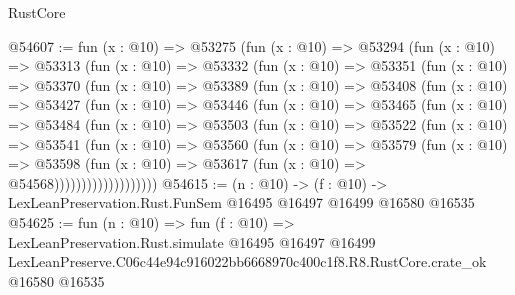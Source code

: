 \begin{lexlean}{RustCore}
\begin{coremodule}
@54607 := fun (x : @10) =>
  @53275
    (fun (x : @10) =>
    @53294
      (fun (x : @10) =>
      @53313
        (fun (x : @10) =>
        @53332
          (fun (x : @10) =>
          @53351
            (fun (x : @10) =>
            @53370
              (fun (x : @10) =>
              @53389
                (fun (x : @10) =>
                @53408
                  (fun (x : @10) =>
                  @53427
                    (fun (x : @10) =>
                    @53446
                      (fun (x : @10) =>
                      @53465
                        (fun (x : @10) =>
                        @53484
                          (fun (x : @10) =>
                          @53503
                            (fun (x : @10) =>
                            @53522
                              (fun (x : @10) =>
                              @53541
                                (fun (x : @10) =>
                                @53560
                                  (fun (x : @10) =>
                                  @53579
                                    (fun (x : @10) =>
                                    @53598
                                      (fun (x : @10) =>
                                      @53617 (fun (x : @10) => @54568)))))))))))))))))))
@54615 := (n : @10) ->
  (f : @10) -> LexLeanPreservation.Rust.FunSem @16495 @16497 @16499 @16580 @16535
@54625 := fun (n : @10) =>
  fun (f : @10) =>
  LexLeanPreservation.Rust.simulate
    @16495
    @16497
    @16499
    LexLeanPreserve.C06c44e94c916022bb6668970c400c1f8.R8.RustCore.crate_ok
    @16580
    @16535
\end{coremodule}
\end{lexlean}
